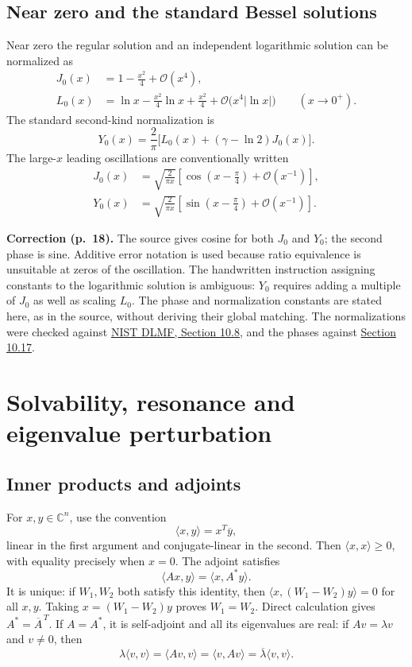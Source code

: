 \documentclass[11pt,a4paper]{article}
\newcommand{\OO}{\mathcal O}
\newcommand{\src}[1]{\par\smallskip{\small\color{gray}Source PDF: page(s) #1.}\par}
\newcommand{\edit}[2]{\par\begingroup\small\color{blue!55!black}\textbf{#1.} #2\par\endgroup}
\numberwithin{equation}{section}
\begin{document}
\subsection{Near zero and the standard Bessel solutions}
Near zero the regular solution and an independent logarithmic solution
can be normalized as
\begin{align*}
 J_0(x)&=1-\frac{x^2}4+\OO(x^4),\\
 L_0(x)&=\ln x-\frac{x^2}4\ln x+\frac{x^2}4
 +\OO\bigl(x^4|\ln x|\bigr)\qquad(x\to0^+).
\end{align*}
The standard second-kind normalization is
\[
 Y_0(x)=\frac2\pi\bigl[L_0(x)+(\gamma-\ln2)J_0(x)\bigr].
\]
The large-$x$ leading oscillations are conventionally written
\begin{align*}
 J_0(x)&=\sqrt{\frac2{\pi x}}
 \left[\cos\left(x-\frac\pi4\right)+\OO(x^{-1})\right],\\
 Y_0(x)&=\sqrt{\frac2{\pi x}}
 \left[\sin\left(x-\frac\pi4\right)+\OO(x^{-1})\right].
\end{align*}
\edit{Correction (p.~18)}{The source gives cosine for both $J_0$
and $Y_0$; the second phase is sine. Additive error notation is used
because ratio equivalence is unsuitable at zeros of the oscillation.
The handwritten instruction assigning constants to the logarithmic
solution is ambiguous: $Y_0$ requires adding a multiple of $J_0$ as
well as scaling $L_0$. The phase and normalization constants are
stated here, as in the source, without deriving their global matching.
The normalizations were checked against
\href{https://dlmf.nist.gov/10.8}{NIST DLMF, Section 10.8}, and the
phases against \href{https://dlmf.nist.gov/10.17}{Section 10.17}.}

\section{Solvability, resonance and eigenvalue perturbation}
\subsection{Inner products and adjoints}
\src{18--19}
For $x,y\in\mathbb C^n$, use the convention
\[
 \langle x,y\rangle=x^T\overline y,
\]
linear in the first argument and conjugate-linear in the second.
Then $\langle x,x\rangle\ge0$, with equality precisely when $x=0$.
The adjoint satisfies
\[
 \langle Ax,y\rangle=\langle x,A^*y\rangle.
\]
It is unique: if $W_1,W_2$ both satisfy this identity, then
$\langle x,(W_1-W_2)y\rangle=0$ for all $x,y$. Taking
$x=(W_1-W_2)y$ proves $W_1=W_2$.
Direct calculation gives $A^*=\overline A^{\,T}$.
If $A=A^*$, it is self-adjoint and all its eigenvalues are real:
if $Av=\lambda v$ and $v\ne0$, then
\[
 \lambda\langle v,v\rangle
 =\langle Av,v\rangle
 =\langle v,Av\rangle
 =\overline\lambda\langle v,v\rangle.
\]
\end{document}
